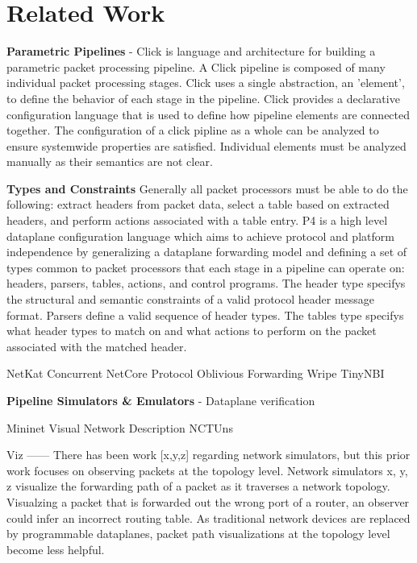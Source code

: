 \section{Related Work}


\textbf{Parametric Pipelines} - Click \cite{click} is language and architecture 
for building a parametric packet processing pipeline. A Click pipeline is 
composed of many individual packet processing stages. Click uses a single 
abstraction, an 'element', to define the behavior of each stage in the pipeline.
Click provides a declarative configuration language that is used to define
how pipeline elements are connected together. The configuration of a click
pipline as a whole can be analyzed to ensure systemwide properties are
satisfied. Individual elements must be analyzed manually as their semantics
are not clear. 

\textbf{Types and Constraints}
Generally all packet processors must be able to do the 
following: extract headers from packet data, select a table based on extracted 
headers, and perform actions associated with a table entry. P4\cite{p4} is a 
high level dataplane configuration language which aims to
achieve protocol and platform independence by generalizing a dataplane 
forwarding model and defining a set of types common to packet processors that 
each stage in a pipeline can operate on: headers, parsers, tables, actions, and
control programs. The header type specifys the structural and semantic 
constraints of a valid protocol header message format. Parsers define a valid 
sequence of header types. The tables type specifys what header types to match 
on and what actions to perform on the packet associated with the matched header.

NetKat\cite{netkat}
Concurrent NetCore\cite{cnetcore}
Protocol Oblivious Forwarding\cite{pof}
Wripe \cite{wripe}
TinyNBI \cite{tinynbi}

\textbf{Pipeline Simulators & Emulators} -
Dataplane verification


Mininet\cite{mininet}
Visual Network Description \cite{vnd}
NCTUns \cite{nctuns}

Viz
------
There has been work [x,y,z] regarding network simulators, but this prior work focuses on observing packets at the topology level. Network simulators x, y, z visualize the forwarding path of a packet as it traverses a network topology. Visualzing a packet that is forwarded out the wrong port of a router, an observer could infer an incorrect routing table. As traditional network devices are replaced by programmable dataplanes, packet path visualizations at the topology level become less helpful.


